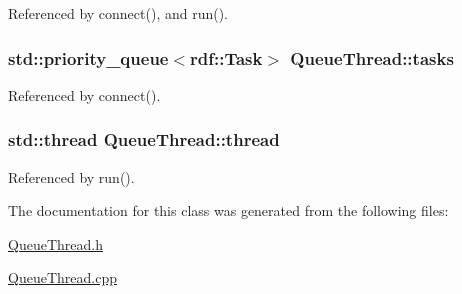 Referenced by connect(), and run().

\subsubsection[{\texorpdfstring{tasks}{tasks}}]{\setlength{\rightskip}{0pt plus 5cm}std\+::priority\+\_\+queue$<${\bf rdf\+::\+Task}$>$ Queue\+Thread\+::tasks}\hypertarget{classQueueThread_a8e8f59dccfcb4a213db1b42aec0e4f4d}{}\label{classQueueThread_a8e8f59dccfcb4a213db1b42aec0e4f4d}


Referenced by connect().

\subsubsection[{\texorpdfstring{thread}{thread}}]{\setlength{\rightskip}{0pt plus 5cm}std\+::thread Queue\+Thread\+::thread}\hypertarget{classQueueThread_a91bdd16de58d62287968b80f68620033}{}\label{classQueueThread_a91bdd16de58d62287968b80f68620033}


Referenced by run().



The documentation for this class was generated from the following files\+:\begin{DoxyCompactItemize}
\item 
\hyperlink{QueueThread_8h}{Queue\+Thread.\+h}\item 
\hyperlink{QueueThread_8cpp}{Queue\+Thread.\+cpp}\end{DoxyCompactItemize}
